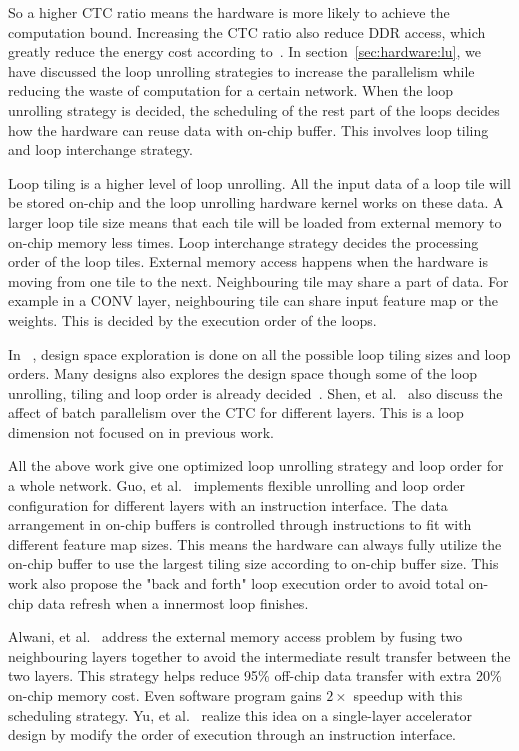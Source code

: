 So a higher CTC ratio means the hardware is more likely to achieve the computation bound. Increasing the CTC ratio also reduce DDR access, which greatly reduce the energy cost according to~\cite{vlsi_energy}. In section~\ref{sec:hardware:lu}, we have discussed the loop unrolling strategies to increase the parallelism while reducing the waste of computation for a certain network. When the loop unrolling strategy is decided, the scheduling of the rest part of the loops decides how the hardware can reuse data with on-chip buffer. This involves loop tiling and loop interchange strategy.

Loop tiling is a higher level of loop unrolling. All the input data of a loop tile will be stored on-chip and the loop unrolling hardware kernel works on these data. A larger loop tile size means that each tile will be loaded from external memory to on-chip memory less times. Loop interchange strategy decides the processing order of the loop tiles. External memory access happens when the hardware is moving from one tile to the next. Neighbouring tile may share a part of data. For example in a CONV layer, neighbouring tile can share input feature map or the weights. This is decided by the execution order of the loops. 

In ~\cite{zhang2015optimizing, ma2017optimizing}, design space exploration is done on all the possible loop tiling sizes and loop orders. Many designs also explores the design space though some of the loop unrolling, tiling and loop order is already decided~\cite{motamedi2016design, qiu2016going}. Shen, et al.~\cite{shen2017escher} also discuss the affect of batch parallelism over the CTC for different layers. This is a loop dimension not focused on in previous work.

All the above work give one optimized loop unrolling strategy and loop order for a whole network. Guo, et al.~\cite{guo2017angel} implements flexible unrolling and loop order configuration for different layers with an instruction interface. The data arrangement in on-chip buffers is controlled through instructions to fit with different feature map sizes. This means the hardware can always fully utilize the on-chip buffer to use the largest tiling size according to on-chip buffer size. This work also propose the "back and forth" loop execution order to avoid total on-chip data refresh when a innermost loop finishes.

Alwani, et al.~\cite{alwani2016fused} address the external memory access problem by fusing two neighbouring layers together to avoid the intermediate result transfer between the two layers. This strategy helps reduce 95\% off-chip data transfer with extra 20\% on-chip memory cost. Even software program gains $2\times$ speedup with this scheduling strategy. Yu, et al.~\cite{Yu2017Instruction} realize this idea on a single-layer accelerator design by modify the order of execution through an instruction interface.

